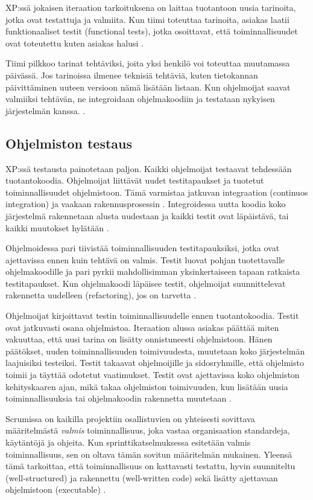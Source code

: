 \documentclass[finnish]{tktltiki2}
\theoremstyle{definition}
\theoremstyle{remark}
\begin{document}
XP:ssä jokaisen iteraation tarkoituksena on laittaa tuotantoon uusia tarinoita, jotka ovat testattuja ja valmiita. Kun tiimi toteuttaa tarinoita, asiakas laatii funktionaaliset testit (functional tests), jotka osoittavat, että toiminnallisuudet ovat toteutettu kuten asiakas halusi \cite{BEC99}.

Tiimi pilkkoo tarinat tehtäviksi, joita yksi henkilö voi toteuttaa muutamassa päivässä. Jos tarinoissa ilmenee teknisiä tehtäviä, kuten tietokannan päivittäminen uuteen versioon nämä lisätään listaan. Kun ohjelmoijat saavat valmiiksi tehtävän, ne integroidaan ohjelmakoodiin ja testataan nykyisen järjestelmän kanssa. \cite{BEC99}.

\subsection{Ohjelmiston testaus}

XP:ssä testausta painotetaan paljon. Kaikki ohjelmoijat testaavat tehdessään tuotantokoodia. Ohjelmoijat liittävät uudet testitapaukset ja tuotetut toiminnallisuudet ohjelmistoon. Tämä varmistaa jatkuvan integraation (continuos integration) ja vaakaan rakennusprosessin \cite{FOW01a}. Integroidessa uutta koodia koko järjestelmä rakennetaan alusta uudestaan ja kaikki testit ovat läpäistävä, tai kaikki muutokset hylätään \cite{BEC99}.

Ohjelmoidessa pari tiivistää toiminnallisuuden testitapauksiksi, jotka ovat ajettavissa ennen kuin tehtävä on valmis. Testit luovat pohjan tuotettavalle ohjelmakoodille ja pari pyrkii mahdollisimman yksinkertaiseen tapaan ratkaista testitapaukset. Kun ohjelmakoodi läpäisee testit, ohjelmoijat suunnittelevat rakennetta uudelleen (refactoring), jos on tarvetta \cite{BEC99}.

Ohjelmoijat kirjoittavat testin toiminnallisuudelle ennen tuotantokoodia. Testit ovat jatkuvasti osana ohjelmistoa. Iteraation alussa asiakas päättää miten vakuuttaa, että uusi tarina on lisätty onnistuneesti ohjelmistoon. Hänen päätökset, uuden toiminnallisuuden toimivuudesta, muutetaan koko järjestelmän laajuisiksi testeiksi. Testit takaavat ohjelmoijille ja sidosryhmille, että ohjelmisto toimii ja täyttää odotetut vaatimukset. Testit ovat ajettavissa koko ohjelmiston kehityskaaren ajan, mikä takaa ohjelmiston toimivuuden, kun lisätään uusia toiminnallisuuksia tai ohjelmakoodin rakennetta muutetaan \cite{BEC99}.

Scrumissa on kaikilla projektiin osallistuvien on yhteisesti sovittava määritelmästä \textit{valmis} toiminnallisuus, joka vastaa organisaation standardeja, käytäntöjä ja ohjeita. Kun sprinttikatselmuksessa esitetään valmis toiminnallisuus, sen on oltava tämän sovitun määritelmän mukainen. Yleensä tämä tarkoittaa, että toiminnallisuus on kattavasti testattu, hyvin suunniteltu (well-structured) ja rakennettu (well-written code) sekä lisätty ajettavaan ohjelmistoon (executable) \cite{SCH09}.
\end{document}
